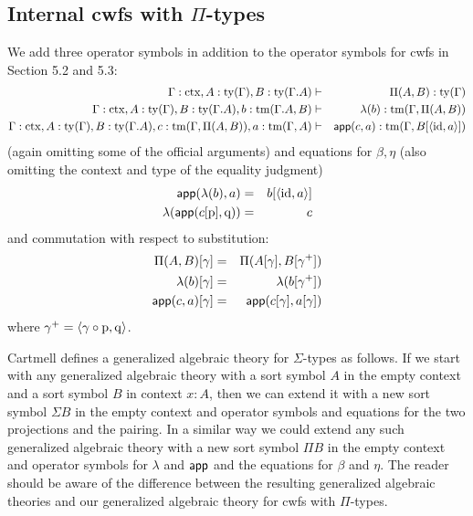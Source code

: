 \documentclass{mscs}
\newcommand{\FYI}[1]{{#1}}
\def\id{\mathrm{id}}
\newcommand{\ctx}{\mathrm{ctx}}
\newcommand{\ty}{\mathrm{ty}}
\newcommand{\tm}{\mathrm{tm}}
\begin{document}


\subsection{Internal cwfs with $\Pi$-types}
We add three operator symbols in addition to the operator symbols for cwfs in Section 5.2 and 5.3:
\begin{eqnarray*}
\Gamma : \ctx, A : \ty(\Gamma), B : \ty(\Gamma.A)&\vdash& \Pi(A,B) : \ty(\Gamma)\\
\Gamma : \ctx, A : \ty(\Gamma), B : \ty(\Gamma.A), b : \tm(\Gamma.A, B) &\vdash& \lambda(b) : \tm(\Gamma,\Pi(A,B))\\
\Gamma : \ctx, A : \ty(\Gamma), B : \ty(\Gamma.A), c :  \tm(\Gamma,\Pi(A,B)), a : \tm(\Gamma, A) &\vdash& \app(c,a) : \tm(\Gamma, B[\tuple{\id,a}])
\end{eqnarray*}
(again omitting some of the official arguments)
and equations for $\beta, \eta$ (also omitting the context and type of the equality judgment)
 \begin{eqnarray*}
 \app(\lambda(b),a) &=& b[\tuple{\id,a}]\\
 \lambda(\app(c[\p],\q)) &=& c
\end{eqnarray*}
and commutation with respect to substitution:
\begin{eqnarray*}
\Pi(A,B)[ \gamma ] &=& \Pi(A [ \gamma ], B[ \gamma^+ ])\\
\lambda(b) [ \gamma ] &=& \lambda(b[\gamma^+ ])\\
\mathsf{app}(c,a) [ \gamma ] &=& \mathsf{app}(c[ \gamma ], a[ \gamma ] )
\end{eqnarray*}
where $\gamma^+ = \langle \gamma \circ \mathrm{p}, \mathrm{q} \rangle$.

\begin{remark}
Cartmell \cite{cartmell:apal} defines a generalized algebraic theory for $\Sigma$-types as follows. If we start with any generalized algebraic theory with a sort symbol $A$ in the empty context and  a sort symbol $B$ in context $x:A$, then we can extend it with a new sort symbol $\Sigma B$ in the empty context and operator symbols and equations for the two projections and the pairing. In a similar way we could extend any such generalized algebraic theory with a new sort symbol $\Pi B$ in the empty context and operator symbols for $\lambda$ and $\mathsf{app}$ and the equations for $\beta$ and $\eta$. The reader should be aware of the difference between the resulting generalized algebraic theories and our generalized algebraic theory for cwfs with $\Pi$-types.
\end{remark}
\end{document}
